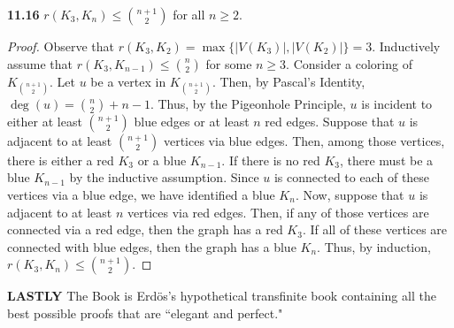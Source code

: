 \documentclass[12pt]{article}
\begin{document}
\newpage\noindent\textbf{11.16} $r(K_3, K_n) \leq {n+1 \choose 2}$ for all $n \geq 2$.
\begin{proof}
    Observe that $r(K_3, K_2) = \max\{|V(K_3)|, |V(K_2)|\} = 3$.
    Inductively assume that $r(K_3, K_{n-1}) \leq {n \choose 2}$ for some $n \geq 3$.
    Consider a coloring of $K_{n + 1 \choose 2}$.
    Let $u$ be a vertex in $K_{n + 1 \choose 2}$.
    Then, by Pascal's Identity, $\deg(u) = {n \choose 2} + n - 1$.
    Thus, by the Pigeonhole Principle, $u$ is incident to either at least ${n+1 \choose 2}$ blue edges or at least $n$ red edges.
    Suppose that $u$ is adjacent to at least ${n+1 \choose 2}$ vertices via blue edges.
    Then, among those vertices, there is either a red $K_3$ or a blue $K_{n-1}$.
    If there is no red $K_3$, there must be a blue $K_{n-1}$ by the inductive assumption.
    Since $u$ is connected to each of these vertices via a blue edge, we have identified a blue $K_n$.
    Now, suppose that $u$ is adjacent to at least $n$ vertices via red edges.
    Then, if any of those vertices are connected via a red edge, then the graph has a red $K_3$.
    If all of these vertices are connected with blue edges, then the graph has a blue $K_n$.
    Thus, by induction, $r(K_3, K_n) \leq {n+1 \choose 2}$.
\end{proof}

\newpage\noindent\textbf{LASTLY} The Book is Erdös's hypothetical transfinite book containing all the best possible proofs that are ``elegant and perfect."
\end{document}
